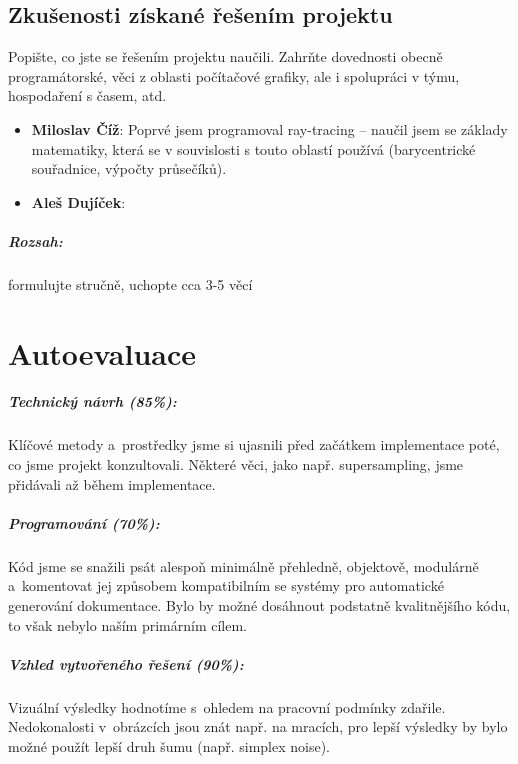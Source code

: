 \documentclass[12pt,a4paper,titlepage,final]{report}
\newcommand\AuthorA{Miloslav Číž}
\newcommand\AuthorB{Aleš Dujíček}
\begin{document}
\section{Zkušenosti získané řešením projektu}

Popište, co jste se řešením projektu naučili. Zahrňte dovednosti obecně
programátorské, věci z oblasti počítačové grafiky, ale i spolupráci v týmu,
hospodaření s časem, atd.

\begin{itemize}
\item \textbf{\AuthorA}: Poprvé jsem programoval ray-tracing -- naučil
jsem se základy matematiky, která se v souvislosti s touto oblastí
používá (barycentrické souřadnice, výpočty průsečíků).
\item \textbf{\AuthorB}:
\end{itemize}

\paragraph{Rozsah:} formulujte stručně, uchopte cca 3-5 věcí

\chapter{Autoevaluace}

\paragraph{Technický návrh (85\%):}
Klíčové metody a~prostředky jsme si ujasnili před začátkem implementace
poté, co jsme projekt konzultovali. Některé věci, jako např.
supersampling, jsme přidávali až během implementace.

\paragraph{Programování (70\%):}
Kód jsme se snažili psát alespoň minimálně přehledně, objektově,
modulárně a~komentovat jej způsobem kompatibilním se systémy
pro automatické generování dokumentace. Bylo by možné
dosáhnout podstatně kvalitnějšího kódu, to však nebylo naším primárním
cílem.

\paragraph{Vzhled vytvořeného řešení (90\%):}
Vizuální výsledky hodnotíme s~ohledem na pracovní podmínky zdařile.
Nedokonalosti v~obrázcích jsou znát např. na mracích, pro lepší výsledky
by bylo možné použít lepší druh šumu (např. simplex noise).
\end{document}
